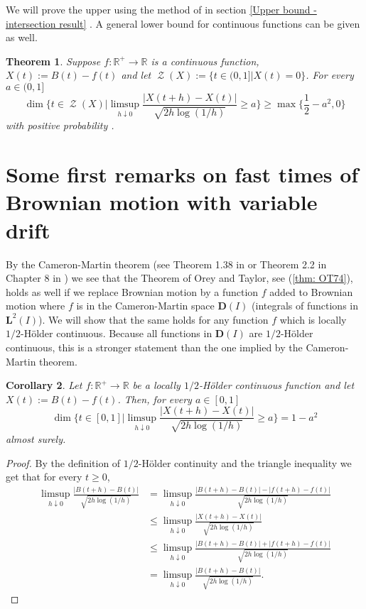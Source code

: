 \documentclass[11pt, reqno]{amsart}
\theoremstyle{plain}
\newtheorem{theorem}{Theorem}[section]
\newtheorem{corollary}[theorem]{Corollary}
\theoremstyle{definition}
\theoremstyle{remark}
\begin{document}
We will prove the upper 
using the method of \cite{KS} in section \ref{Upper bound - intersection result}
. A general lower bound for continuous functions can be given as well.

\begin{theorem}\label{thm: intersection fast times and zeroset - continuous functions}
Suppose $f \colon \mathbb{R}^+ \to \mathbb{R}$ is a continuous function, $X(t):= B(t)-f(t)$ and let $\operatorname{\mathcal{Z}}(X):=\{ t\in(0,1] | X(t)= 0 \}$. For every $a\in(0,1]$
\[
\dim \Big\{ t\in\operatorname{\mathcal{Z}}(X) \Big| \limsup_{h \downarrow 0} \frac{|X(t+h)-X(t)|}{\sqrt{2h\log{(1/h)}}} \geq a  \Big\} \geq \max \Big\{\frac{1}{2}-a^2, 0 
\Big\}
\]
with positive probability
.
\end{theorem}
\section{Some first remarks on fast times of Brownian motion with variable drift}\label{firstremarkssection}

By the Cameron-Martin theorem (see Theorem 1.38 in \cite{MP} or Theorem 2.2 in Chapter 8 in \cite{RY}) we see that the Theorem of Orey and Taylor, see (\ref{thm: OT74}), holds as well if we replace Brownian motion by a function $f$ added to Brownian motion where $f$ is in the Cameron-Martin space $\mathbf{D}(I)$ (integrals of functions in $\mathbf{L}^2(I)$).
We will show that the same holds for any function $f$ which is locally $1/2$-H\"{o}lder continuous. Because all functions in $\mathbf{D}(I)$ are $1/2$-H\"{o}lder continuous, this is a stronger statement than the one implied by the Cameron-Martin theorem.

\begin{corollary}\label{cor: fasttimeswithhoelder}
Let $f \colon \mathbb{R}^+ \to \mathbb{R}$ be a locally $1/2$-{H\"{o}lder } continuous function and let $X(t):= B(t)-f(t)$. Then, for every $a\in[0,1]$
\[
\dim \Big\{ t\in[0,1] \Big| \limsup_{h \downarrow 0} \frac{|X(t+h)-X(t)|}{\sqrt{2h\log{(1/h)}}} \geq a \Big\} = 1-a^2
\]
almost surely.
\end{corollary}
\begin{proof}
By the definition of $1/2$-{H\"{o}lder } continuity and the triangle inequality we get that for every $t\geq 0$,
\begin{align*}
\limsup_{h \downarrow 0} \frac{|B(t+h)-B(t)|}{\sqrt{2h\log{(1/h)}}} &= \limsup_{h \downarrow 0} \frac{|B(t+h)-B(t)| - |f(t+h)-f(t)|}{\sqrt{2h\log{(1/h)}}} \\ &\leq \limsup_{h \downarrow 0} \frac{|X(t+h)-X(t)|}{\sqrt{2h\log{(1/h)}}} \\ &\leq \limsup_{h \downarrow 0} \frac{|B(t+h)-B(t)| + |f(t+h)-f(t)|}{\sqrt{2h\log{(1/h)}}}
\\&= \limsup_{h \downarrow 0} \frac{|B(t+h)-B(t)|}{\sqrt{2h\log{(1/h)}}}.
\end{align*}
\end{proof}
\end{document}
